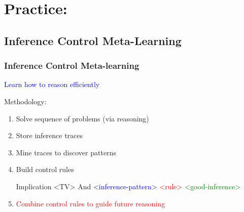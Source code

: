 \documentclass{beamer}
\begin{document}
\section{Practice:}
\subsection{Inference Control Meta-Learning}

\begin{frame}[fragile]
  \frametitle{Inference Control Meta-learning}
  \begin{center}\textcolor{blue}{Learn how to reason efficiently}\end{center}

  Methodology:
  \begin{enumerate}
  \item<+-> Solve sequence of problems (via reasoning)
  \item<+-> Store inference traces
  \item<+-> Mine traces to discover patterns
  \item<+-> Build control rules
{\small
\begin{semiverbatim}
  Implication <TV>
    And
      \textcolor{blue}{<inference-pattern>}
      \textcolor{red}{<rule>}
    \textcolor{green}{<good-inference>}
\end{semiverbatim}
}  
  \item<+-> \textcolor{red}{Combine control rules to guide future
      reasoning}
  \end{enumerate}
\end{frame}
\end{document}
